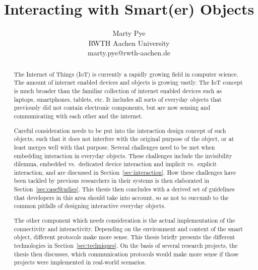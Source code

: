 \documentclass{acm_proc_article-sp}
\begin{document}
\title{Interacting with Smart(er) Objects}

\author{Marty Pye\\ RWTH Aachen University\\ marty.pye@rwth-aachen.de}

\maketitle
\begin{abstract}
The Internet of Things (IoT) is currently a rapidly growing field in computer science.
The amount of internet enabled devices and objects is growing vastly. 
The IoT concept is much broader than the familiar collection of internet enabled devices such as laptops, smartphones, tablets, etc.
It includes all sorts of everyday objects that previously did not contain electronic components, but are now sensing and communicating with each other and the internet.

Careful consideration needs to be put into the interaction design concept of such objects, such that it does not interfere with the original purpose of the object, or at least merges well with that purpose.
Several challenges need to be met when embedding interaction in everyday objects.
These challenges include the invisibility dilemma, embedded vs.\ dedicated device interaction and implicit vs.\ explicit interaction, and are discussed in Section~\ref{sec:interaction}.
How these challenges have been tackled by previous researchers in their systems is then elaborated in Section~\ref{sec:caseStudies}. 
This thesis then concludes with a derived set of guidelines that developers in this area should take into account, so as not to succumb to the common pitfalls of designing interactive everyday objects.

The other component which needs consideration is the actual implementation of the connectivity and interactivity. Depending on the environment and context of the smart object, different protocols make more sense.
This thesis briefly presents the different technologies in Section~\ref{sec:techniques}.
On the basis of several research projects, the thesis then discusses, which communication protocols would make more sense if those projects were implemented in real-world scenarios.
\end{abstract}
\end{document}
